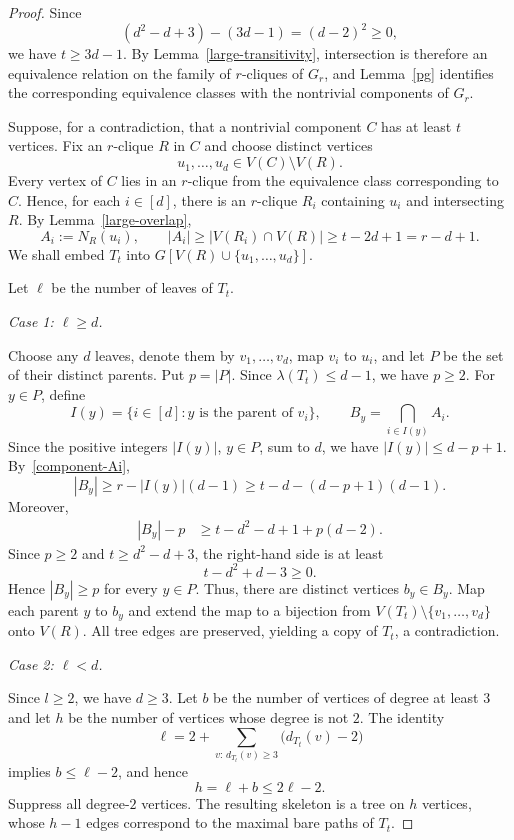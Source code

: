\documentclass[11pt,a4paper]{article}
\begin{document}
\begin{proof}
Since
\[
(d^2-d+3)-(3d-1)=(d-2)^2\ge0,
\]
we have $t\ge3d-1$. By Lemma~\ref{large-transitivity}, intersection is therefore an equivalence relation on the family of $r$-cliques of $G_r$, and Lemma~\ref{pg} identifies the corresponding equivalence classes with the nontrivial components of $G_r$.

Suppose, for a contradiction, that a nontrivial component $C$ has at least $t$ vertices. Fix an $r$-clique $R$ in $C$ and choose distinct vertices
\[
u_1,\ldots,u_d\in V(C)\setminus V(R).
\]
Every vertex of $C$ lies in an $r$-clique from the equivalence class corresponding to $C$. Hence, for each $i\in[d]$, there is an $r$-clique $R_i$ containing $u_i$ and intersecting $R$. By Lemma~\ref{large-overlap},
\begin{equation}\label{component-Ai}
A_i:=N_R(u_i),
\qquad
|A_i|\ge |V(R_i)\cap V(R)|\ge t-2d+1=r-d+1.
\end{equation}
We shall embed $T_t$ into $G[V(R)\cup\{u_1,\ldots,u_d\}]$.

Let $\ell$ be the number of leaves of $T_t$.

\smallskip
\noindent\emph{Case 1: $\ell\ge d$.}

Choose any $d$ leaves, denote them by $v_1,\ldots,v_d$, map $v_i$ to $u_i$, and let $P$ be the set of their distinct parents. Put $p=|P|$. Since $\lambda(T_t)\le d-1$, we have $p\ge2$. For $y\in P$, define
\[
I(y)=\{i\in[d]:y\text{ is the parent of }v_i\},
\qquad
B_y=\bigcap_{i\in I(y)}A_i.
\]
Since the positive integers $|I(y)|$, $y\in P$, sum to $d$, we have $|I(y)|\le d-p+1$. By~\eqref{component-Ai},
\[
|B_y|\ge r-|I(y)|(d-1)
\ge t-d-(d-p+1)(d-1).
\]
Moreover,
\[
\begin{aligned}
|B_y|-p
&\ge t-d^2-d+1+p(d-2).
\end{aligned}
\]
Since $p\ge2$ and $t\ge d^2-d+3$, the right-hand side is at least
\[
t-d^2+d-3\ge0.
\]
Hence $|B_y|\ge p$ for every $y\in P$. Thus,  there are distinct vertices $b_y\in B_y$. Map each parent $y$ to $b_y$ and extend the map to a bijection from $V(T_t)\setminus\{v_1,\ldots,v_d\}$ onto $V(R)$. All tree edges are preserved, yielding a copy of $T_t$, a contradiction.

\smallskip
\noindent\emph{Case 2: $\ell<d$.}

Since $l\ge 2$, we have $d\ge3$. Let $b$ be the number of vertices of degree at least $3$ and let $h$ be the number of vertices whose degree is not $2$. The identity
\[
\ell=2+\sum_{v:\,d_{T_t}(v)\ge3}\bigl(d_{T_t}(v)-2\bigr)
\]
implies $b\le\ell-2$, and hence
\[
h=\ell+b\le2\ell-2.
\]
Suppress all degree-$2$ vertices. The resulting skeleton is a tree on $h$ vertices, whose $h-1$ edges correspond to the maximal bare paths of $T_t$.


\end{proof}
\end{document}
